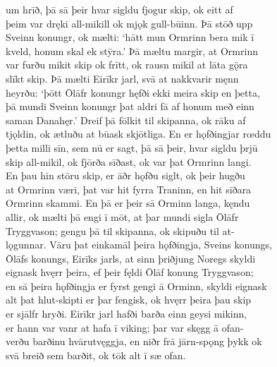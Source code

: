 \documentclass[12pt,letterpaper]{book}
\begin{document}
\begin{linenumbers}
um hrīð, þā sā þeir hvar sigldu fjogur skip, ok eitt af\\
þeim var dręki all-mikill ok mjǫk gull-būinn.  Þā stōð upp\\
Sveinn konungr, ok mælti: `hātt mun Ormrinn bera mik ī\\
kveld, honum skal ek stȳra.'  Þā mæltu margir, at Ormrinn\\
var furðu mikit skip ok frītt, ok rausn mikil at lāta gǫ̈ra\\
slīkt skip.  Þā mælti Eirīkr jarl, svā at nakkvarir męnn\\
heyrðu: `þōtt Ōlāfr konungr hęfði ekki meira skip en þetta,\\
þā mundi Sveinn konungr þat aldri fā af honum með einn\\
saman Danahęr.'  Dreif þā fōlkit til skipanna, ok rāku af\\
tjǫldin, ok ætluðu at būask skjōtliga.  En er hǫfðingjar rœddu\\
þetta milli sīn, sem nū er sagt, þā sā þeir, hvar sigldu þrjū\\
skip all-mikil, ok fjōrða sīðast, ok var þat Ormrinn langi.\\
En þau hin stōru skip, er āðr hǫfðu siglt, ok þeir hugðu\\
at Ormrinn væri, þat var hit fyrra Traninn, en hit sīðara\\
Ormrinn skammi.  En þā er þeir sā Orminn langa, kęndu\\
allir, ok mælti þā engi ī mōt, at þar mundi sigla Ōlāfr\\
Tryggvason; gengu þā til skipanna, ok skipuðu til at-\\
lǫgunnar.  Vāru þat einkamāl þeira hǫfðingja, Sveins konungs,\\
Ōlāfs konungs, Eirīks jarls, at sinn þriðjung Noregs skyldi\\
eignask hvęrr þeira, ef þeir fęldi Ōlāf konung Tryggvason;\\
en sā þeira hǫfðingja er fyrst gengi ā Orminn, skyldi eignask\\
alt þat hlut-skipti er þar fengisk, ok hvęrr þeira þau skip\\
er sjālfr hryði.  Eirīkr jarl hafði barða einn geysi mikinn,\\
er hann var vanr at hafa ī viking; þar var skęgg ā ofan-\\
verðu barðinu hvārutvęggja, en niðr frā jārn-spǫng þykk ok\\
svā breið sem barðit, ok tōk alt ī sæ ofan.


\end{linenumbers}
\end{document}

